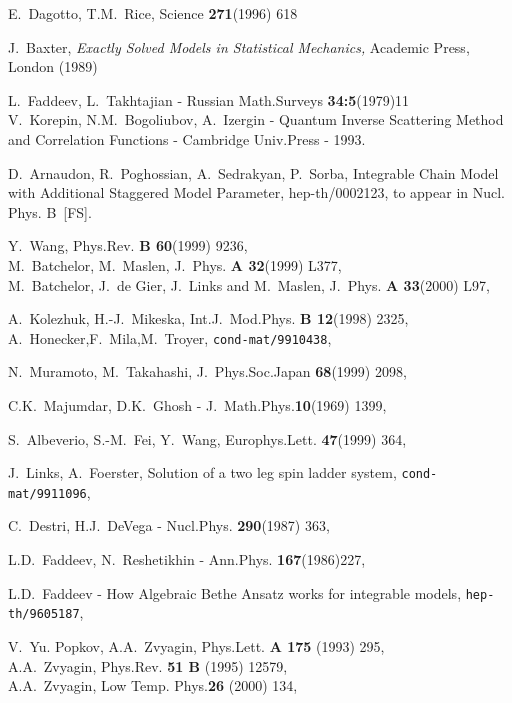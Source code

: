 \documentclass[a4paper,12pt]{article}
\begin{document}
\begin{thebibliography}{10}

 E.~Dagotto, T.M.~Rice,  Science {\bf 271}(1996) 618

 J.~Baxter, \textsl{Exactly Solved Models in Statistical
    Mechanics,} Academic Press, London (1989)

 L.~Faddeev, L.~Takhtajian - Russian Math.Surveys {\bf 34:5}(1979)11\\
            V.~Korepin, N.M.~Bogoliubov, A.~Izergin - 
\newblock Quantum Inverse Scattering Method and Correlation Functions - 
Cambridge Univ.Press - 1993.

  D.~Arnaudon, R.~Poghossian, A.~Sedrakyan, P.~Sorba, Integrable
                Chain Model with Additional Staggered Model Parameter,
                hep-th/0002123, to appear in Nucl. Phys. B~[FS].  

 Y.~Wang, Phys.Rev. {\bf B 60}(1999) 9236,\\
             M.~Batchelor, M.~Maslen, J.~Phys. {\bf A 32}(1999) L377,\\
             M.~Batchelor, J.~de Gier, J.~Links and M.~Maslen, 
             J.~Phys. {\bf A 33}(2000) L97,

 A.~Kolezhuk, H.-J.~Mikeska, Int.J.~Mod.Phys. 
     {\bf B 12}(1998) 2325,\\
             A.~Honecker,F.~Mila,M.~Troyer, \texttt{cond-mat/9910438},

 N.~Muramoto, M.~Takahashi, J.~Phys.Soc.Japan  
     {\bf 68}(1999) 2098,

 C.K.~Majumdar, D.K.~Ghosh -  J.~Math.Phys.{\bf 10}(1969) 1399,

 S.~Albeverio, S.-M.~Fei, Y.~Wang, Europhys.Lett. 
     {\bf 47}(1999) 364,

 J.~Links, A.~Foerster, Solution of a two leg spin ladder 
  system, \texttt{cond-mat/9911096},

 C.~Destri, H.J.~DeVega -  Nucl.Phys. {\bf 290}(1987) 363,

 L.D.~Faddeev, N.~Reshetikhin -  Ann.Phys. {\bf 167}(1986)227,

 L.D.~Faddeev - How Algebraic Bethe Ansatz works for 
         integrable models, \texttt{hep-th/9605187},

 V.~Yu. Popkov, A.A.~Zvyagin, Phys.Lett. {\bf A 175} (1993) 295,\\
            A.A.~Zvyagin, Phys.Rev. {\bf 51 B} (1995) 12579,\\
            A.A.~Zvyagin, Low Temp. Phys.{\bf 26} (2000) 134,


\end{thebibliography}
\end{document}
